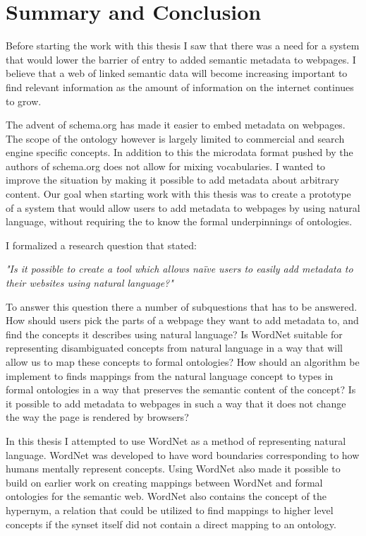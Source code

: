 
\chapter{Summary and Conclusion} %
\label{Conclusion} %
Before starting the work with this thesis I saw that there was a need for a system that would lower the barrier of
entry to added semantic metadata to webpages.
I believe that a web of linked semantic data will become increasing important to find relevant information as the amount
of information on the internet continues to grow.

The advent of schema.org has made it easier to embed metadata on webpages.
The scope of the ontology however is largely limited to commercial and search engine specific concepts.
In addition to this the microdata format pushed by the authors of schema.org does not allow for mixing vocabularies.
I wanted to improve the situation by making it possible to add metadata about arbitrary content.
Our goal when starting work with this thesis was to create a prototype of a system that would allow users to add metadata to webpages by using natural language,
without requiring the to know the formal underpinnings of ontologies.

I formalized a research question that stated:

\emph{"Is it possible to create a tool which allows naïve users to easily add metadata to their websites using natural language?"}

To answer this question there a number of subquestions that has to be answered.
How should users pick the parts of a webpage they want to add metadata to, and find the concepts it describes using natural language?
Is WordNet suitable for representing disambiguated concepts from natural language in a way that will allow us to map these concepts to formal ontologies?
How should an algorithm be implement to finds mappings from the natural language concept to types in
formal ontologies in a way that preserves the semantic content of the concept?
Is it possible to add metadata to webpages in such a way that it does not change the way the page is rendered by browsers?

In this thesis I attempted to use WordNet as a method of representing natural language.
WordNet was developed to have word boundaries corresponding to how humans mentally represent concepts.
Using WordNet also made it possible to  build on earlier work on creating mappings between WordNet and formal ontologies for the semantic web.
WordNet also contains the concept of the hypernym, a relation that could be utilized to find mappings to higher level concepts
if the synset itself did not contain a direct mapping to an ontology.

